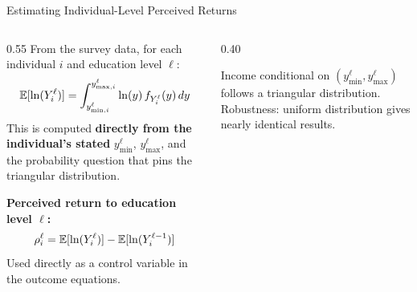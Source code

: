 \documentclass[aspectratio=169, 10pt]{beamer}
\begin{document}
\begin{frame}{Estimating Individual-Level Perceived Returns}
  \begin{columns}
    \begin{column}{0.55\textwidth}
      From the survey data, for each individual $i$ and education level $\ell$:
      \[
        \mathbb{E}[\ln(Y^{\ell}_i)] = \int_{y^\ell_{\min,i}}^{y^\ell_{\max,i}} \ln(y)\, f_{Y^\ell_i}(y)\, dy
      \]
      \vspace{0.3em}
      This is computed \textbf{directly from the individual's stated} $y^\ell_{\min}$, $y^\ell_{\max}$, and the probability question that pins the triangular distribution.

      \vspace{0.5em}
      \textbf{Perceived return to education level $\ell$:}
      \[
        \rho^\ell_i = \mathbb{E}[\ln(Y^\ell_i)] - \mathbb{E}[\ln(Y^{\ell-1}_i)]
      \]
      Used directly as a control variable in the outcome equations.
    \end{column}
    \begin{column}{0.40\textwidth}
      \begin{assumptionbox}
        Income conditional on $(y^\ell_{\min}, y^\ell_{\max})$ follows a triangular distribution. Robustness: uniform distribution gives nearly identical results.
      \end{assumptionbox}
    \end{column}
  \end{columns}
\end{frame}
\end{document}
